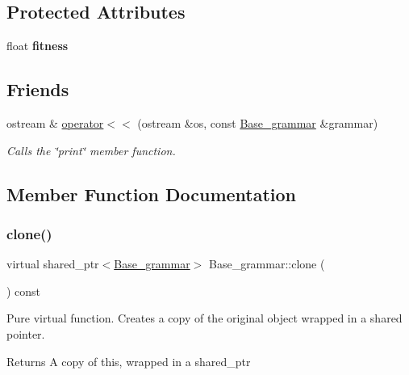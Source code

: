 \subsection*{Protected Attributes}
\begin{DoxyCompactItemize}
\item 
\mbox{\label{classBase__grammar_a6ce16d4442c3047c12345861ed156c3d}} 
float {\bfseries fitness}
\end{DoxyCompactItemize}
\subsection*{Friends}
\begin{DoxyCompactItemize}
\item 
ostream \& \mbox{\hyperlink{classBase__grammar_ab04745c0a138e31011c5df01ff3e092d}{operator$<$$<$}} (ostream \&os, const \mbox{\hyperlink{classBase__grammar}{Base\+\_\+grammar}} \&grammar)
\begin{DoxyCompactList}\small\item\em Calls the \char`\"{}print\char`\"{} member function. \end{DoxyCompactList}\end{DoxyCompactItemize}


\subsection{Member Function Documentation}
\mbox{\label{classBase__grammar_a46bdb324d10ba87d7faf654e8d041b38}} 
\subsubsection{\texorpdfstring{clone()}{clone()}}
{\footnotesize\ttfamily virtual shared\+\_\+ptr$<$\mbox{\hyperlink{classBase__grammar}{Base\+\_\+grammar}}$>$ Base\+\_\+grammar\+::clone (\begin{DoxyParamCaption}{ }\end{DoxyParamCaption}) const\hspace{0.3cm}{\ttfamily [pure virtual]}}



Pure virtual function. Creates a copy of the original object wrapped in a shared pointer. 

\begin{DoxyReturn}{Returns}
A copy of this, wrapped in a shared\+\_\+ptr 
\end{DoxyReturn}


